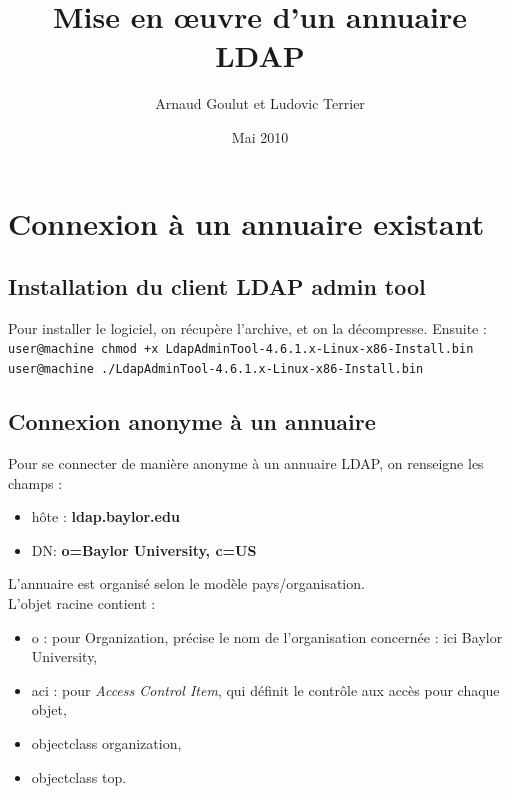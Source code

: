 \documentclass[12pt,a4paper,notitlepage]{article}
\begin{document}
\title{Mise en \oe uvre d'un annuaire LDAP}
\author{Arnaud Goulut et Ludovic Terrier}
\date{Mai 2010}
\maketitle



\thispagestyle{empty}




\section{Connexion à un annuaire existant}

\subsection{Installation du client LDAP admin tool}
Pour installer le logiciel, on récupère l'archive, et on la décompresse. Ensuite : \\

\noindent \texttt{user@machine  chmod +x LdapAdminTool-4.6.1.x-Linux-x86-Install.bin \\
user@machine  ./LdapAdminTool-4.6.1.x-Linux-x86-Install.bin}
\bigskip


\subsection{Connexion anonyme à un annuaire}
Pour se connecter de manière anonyme à un annuaire LDAP, on renseigne les champs :

\begin{itemize}
\item hôte : \textbf{ldap.baylor.edu}
\item DN: \textbf{o=Baylor University, c=US}
\end{itemize}

\bigskip

L'annuaire est organisé selon le modèle pays/organisation. \\

L'objet racine contient :
\begin{itemize}
\item o : pour Organization, précise le nom de l'organisation concernée : ici Baylor University,
\item aci : pour \textit{Access Control Item}, qui définit le contrôle aux accès pour chaque objet,
\item objectclass organization,
\item objectclass top.\\
\end{itemize}
\end{document}
